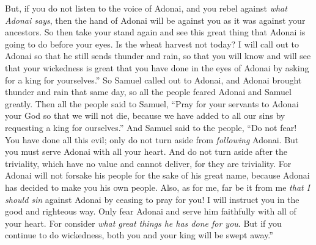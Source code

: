 \begin{biblechapter}
\verse But, if you do not listen to the voice of Adonai, and you rebel against \textit{what Adonai says}, then the hand of Adonai will be against you as it was against your ancestors.
\verse So then take your stand again and see this great thing that Adonai is going to do before your eyes.
\verse Is the wheat harvest not today? I will call out to Adonai so that he still sends thunder and rain, so that you will know and will see that your wickedness is great that you have done in the eyes of Adonai by asking for a king for yourselves.”
\verse So Samuel called out to Adonai, and Adonai brought thunder and rain that same day, so all the people feared Adonai and Samuel greatly.
\verse Then all the people said to Samuel, “Pray for your servants to Adonai your God so that we will not die, because we have added to all our sins by requesting a king for ourselves.”
\verse And Samuel said to the people, “Do not fear! You have done all this evil; only do not turn aside from \textit{following} Adonai. But you must serve Adonai with all your heart.
\verse And do not turn aside after the triviality, which have no value and cannot deliver, for they are triviality.
\verse For Adonai will not forsake his people for the sake of his great name, because Adonai has decided to make you his own people.
\verse Also, as for me, far be it from me \textit{that I should sin} against Adonai by ceasing to pray for you! I will instruct you in the good and righteous way.
\verse Only fear Adonai and serve him faithfully with all of your heart. For consider \textit{what great things he has done for you}.
\verse But if you continue to do wickedness, both you and your king will be swept away.”
\end{biblechapter}

